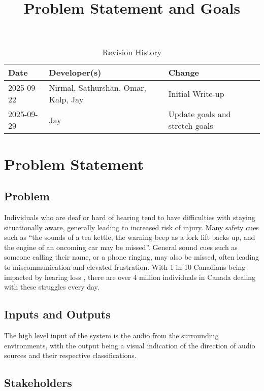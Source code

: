 \documentclass{article}
\title{Problem Statement and Goals\\\progname}
\author{\authname}
\date{}
\begin{document}
\maketitle

\begin{table}[hp]
\caption{Revision History} \label{TblRevisionHistory}
\begin{tabularx}{\textwidth}{llX}
\toprule
\textbf{Date} & \textbf{Developer(s)} & \textbf{Change}\\
\midrule
2025-09-22 & Nirmal, Sathurshan, Omar, Kalp, Jay & Initial Write-up\\
2025-09-29 & Jay & Update goals and stretch goals\\
\bottomrule
\end{tabularx}
\end{table}

\newpage{}

\section{Problem Statement}

\subsection{Problem}

Individuals who are deaf or hard of hearing tend to have difficulties with
staying situationally aware, generally leading to increased risk of injury. Many
safety cues such as ``the sounds of a tea kettle, the warning beep as a fork lift
backs up, and the engine of an oncoming car may be missed''. \cite{Masterson2016}
General sound cues such as someone calling their name, or a phone ringing, may
also be missed, often leading to miscommunication and elevated frustration. With
1 in 10 Canadians being impacted by hearing loss \cite{Healthing2025}, there are
over 4 million individuals in Canada dealing with these struggles every day.


\subsection{Inputs and Outputs}

The high level input of the system is the audio from the surrounding
environments, with the output being a visual indication of the direction of
audio sources and their respective classifications.

\subsection{Stakeholders}
\end{document}
